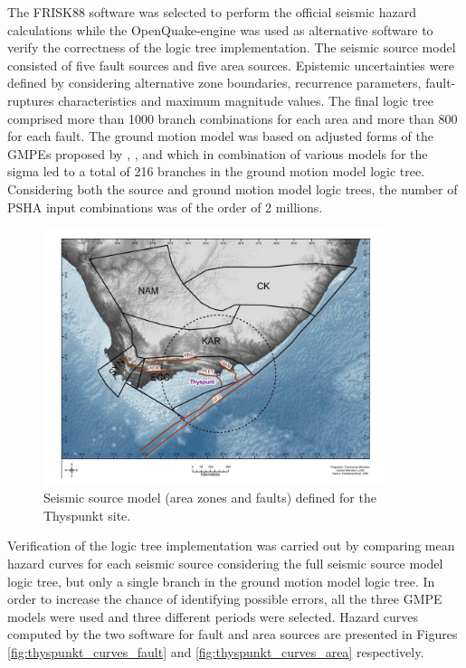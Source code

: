 The FRISK88 software was selected to perform the official seismic hazard
calculations while the OpenQuake-engine was used as alternative software to
verify the correctness of the logic tree implementation. The seismic source
model consisted of five fault sources and five area sources. 
%
Epistemic uncertainties were defined by considering alternative zone boundaries,
recurrence parameters, fault-ruptures characteristics and maximum magnitude
values. The final logic tree comprised more than 1000 branch combinations for
each area and more than 800 for each fault. 
%
The ground motion model was based on adjusted forms of the GMPEs proposed by 
\citet{abrahamson2008}, \citet{chiou2008}, and \citet{akkar_cagnan_2010} which
in combination of various models for the sigma led to a total of 216 branches in
the ground motion model logic tree.  Considering both the source and ground
motion model logic trees, the number of PSHA input combinations was of the order
of 2 millions.
%
\begin{figure}
\centering
\includegraphics[width=10cm]{./qareport/pictures/ThyspunktSourceModel.jpg}
\caption{Seismic source model (area zones and faults) defined for the Thyspunkt site.}
\label{fig:thyspunkt_source_model}
\end{figure}
%
Verification of the logic tree implementation was carried out by comparing mean
hazard curves for each seismic source considering the full seismic source model
logic tree, but only a single branch in the ground motion model logic tree. In
order to increase the chance of identifying possible errors, all the three GMPE
models were used and three different periods were selected. 
%
Hazard curves computed by the two software for fault and area sources are
presented in Figures \ref{fig:thyspunkt_curves_fault} and
\ref{fig:thyspunkt_curves_area} respectively.

